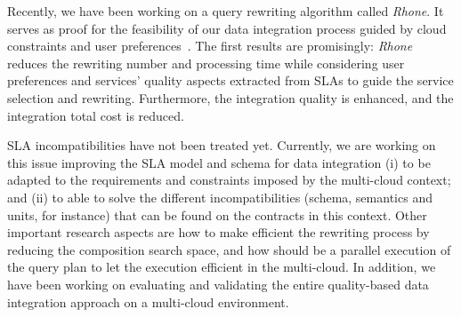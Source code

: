 Recently, we have been working on a query rewriting algorithm called \textit{Rhone}. It serves as proof for the feasibility of our data integration process guided by cloud constraints and user preferences~\cite{carvalho2016}. The first results are promisingly: \textit{Rhone} reduces the rewriting number and processing time while considering user preferences and services' quality aspects extracted from SLAs to guide the service selection and rewriting. Furthermore, the integration quality is enhanced, and the integration total cost is reduced.

SLA incompatibilities have not been treated yet. Currently, we are working on this issue improving the SLA model and schema for data integration (i) to be adapted to the requirements and constraints imposed by the multi-cloud context; and (ii) to able to solve the different incompatibilities (schema, semantics and units, for instance) that can be found on the contracts in this context.  Other important research aspects are how to make efficient the rewriting process by reducing the composition search space, and how should be a parallel execution of the query plan to let the execution efficient in the multi-cloud. In addition, we have been working on evaluating and validating the entire quality-based data integration approach on a multi-cloud environment. 